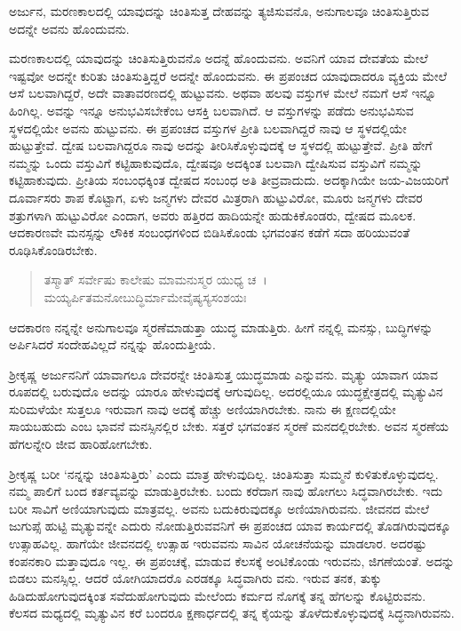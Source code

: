 {\small ಅರ್ಜುನ, ಮರಣಕಾಲದಲ್ಲಿ ಯಾವುದನ್ನು ಚಿಂತಿಸುತ್ತ ದೇಹವನ್ನು ತ್ಯಜಿಸುವನೊ, ಅನುಗಾಲವೂ ಚಿಂತಿಸುತ್ತಿರುವ ಅದನ್ನೇ ಅವನು ಹೊಂದುವನು.}

ಮರಣಕಾಲದಲ್ಲಿ ಯಾವುದನ್ನು ಚಿಂತಿಸುತ್ತಿರುವನೊ ಅದನ್ನೆ ಹೊಂದುವನು. ಅವನಿಗೆ ಯಾವ ದೇವತೆಯ ಮೇಲೆ ಇಷ್ಟವೋ ಅದನ್ನೇ ಕುರಿತು ಚಿಂತಿಸುತ್ತಿದ್ದರೆ ಅದನ್ನೇ ಹೊಂದುವನು. ಈ ಪ್ರಪಂಚದ ಯಾವುದಾದರೂ ವ್ಯಕ್ತಿಯ ಮೇಲೆ ಆಸೆ ಬಲವಾಗಿದ್ದರೆ, ಅದೇ ವಾತಾವರಣದಲ್ಲಿ ಹುಟ್ಟುವನು. ಅಥವಾ ಹಲವು ವಸ್ತುಗಳ ಮೇಲೆ ನಮಗೆ ಆಸೆ ಇನ್ನೂ ಹಿಂಗಿಲ್ಲ. ಅವನ್ನು ಇನ್ನೂ ಅನುಭವಿಸಬೇಕೆಂಬ ಆಸಕ್ತಿ ಬಲವಾಗಿದೆ. ಆ ವಸ್ತುಗಳನ್ನು ಪಡೆದು ಅನುಭವಿಸುವ ಸ್ಥಳದಲ್ಲಿಯೇ ಅವನು ಹುಟ್ಟುವನು. ಈ ಪ್ರಪಂಚದ ವಸ್ತುಗಳ ಪ್ರೀತಿ ಬಲವಾಗಿದ್ದರೆ ನಾವು ಆ ಸ್ಥಳದಲ್ಲಿಯೇ ಹುಟ್ಟುತ್ತೇವೆ. ದ್ವೇಷ ಬಲವಾಗಿದ್ದರೂ ನಾವು ಅದನ್ನು ತೀರಿಸಿಕೊಳ್ಳುವುದಕ್ಕೆ ಆ ಸ್ಥಳದಲ್ಲಿ ಹುಟ್ಟುತ್ತೇವೆ. ಪ್ರೀತಿ ಹೇಗೆ ನಮ್ಮನ್ನು ಒಂದು ವಸ್ತುವಿಗೆ ಕಟ್ಟಿಹಾಕುವುದೊ, ದ್ವೇಷವೂ ಅದಕ್ಕಿಂತ ಬಲವಾಗಿ ದ್ವೇಷಿಸುವ ವಸ್ತುವಿಗೆ ನಮ್ಮನ್ನು ಕಟ್ಟಿಹಾಕುವುದು. ಪ್ರೀತಿಯ ಸಂಬಂಧಕ್ಕಿಂತ ದ್ವೇಷದ ಸಂಬಂಧ ಅತಿ ತೀವ್ರವಾದುದು. ಅದಕ್ಕಾಗಿಯೇ ಜಯ-ವಿಜಯರಿಗೆ ದೂರ್ವಾಸರು ಶಾಪ ಕೊಟ್ಟಾಗ, ಏಳು ಜನ್ಮಗಳು ದೇವರ ಮಿತ್ರರಾಗಿ ಹುಟ್ಟುವಿರೋ, ಮೂರು ಜನ್ಮಗಳು ದೇವರ ಶತ್ರುಗಳಾಗಿ ಹುಟ್ಟುವಿರೋ ಎಂದಾಗ, ಅವರು ಹತ್ತಿರದ ಹಾದಿಯನ್ನೇ ಹುಡುಕಿಕೊಂಡರು, ದ್ವೇಷದ ಮೂಲಕ. ಆದಕಾರಣವೇ ಮನಸ್ಸನ್ನು ಲೌಕಿಕ ಸಂಬಂಧಗಳಿಂದ ಬಿಡಿಸಿಕೊಂಡು ಭಗವಂತನ ಕಡೆಗೆ ಸದಾ ಹರಿಯುವಂತೆ ರೂಢಿಸಿಕೊಂಡಿರಬೇಕು.

\begin{verse}
ತಸ್ಮಾತ್ ಸರ್ವೇಷು ಕಾಲೇಷು ಮಾಮನುಸ್ಮರ ಯುಧ್ಯ ಚ~।\\ಮಯ್ಯರ್ಪಿತಮನೋಬುದ್ಧಿರ್ಮಾಮೇವೈಷ್ಯಸ್ಯಸಂಶಯಃ 
\end{verse}

{\small ಆದಕಾರಣ ನನ್ನನ್ನೇ ಅನುಗಾಲವೂ ಸ್ಮರಣೆಮಾಡುತ್ತಾ ಯುದ್ಧ ಮಾಡುತ್ತಿರು. ಹೀಗೆ ನನ್ನಲ್ಲಿ ಮನಸ್ಸು, ಬುದ್ಧಿಗಳನ್ನು ಅರ್ಪಿಸಿದರೆ ಸಂದೇಹವಿಲ್ಲದೆ ನನ್ನನ್ನು ಹೊಂದುತ್ತೀಯೆ.}

ಶ‍್ರೀಕೃಷ್ಣ ಅರ್ಜುನನಿಗೆ ಯಾವಾಗಲೂ ದೇವರನ್ನೇ ಚಿಂತಿಸುತ್ತ ಯುದ್ಧಮಾಡು ಎನ್ನುವನು. ಮೃತ್ಯು ಯಾವಾಗ ಯಾವ ರೂಪದಲ್ಲಿ ಬರುವುದೊ ಅದನ್ನು ಯಾರೂ ಹೇಳುವುದಕ್ಕೆ ಆಗುವುದಿಲ್ಲ. ಅದರಲ್ಲಿಯೂ ಯುದ್ಧಕ್ಷೇತ್ರದಲ್ಲಿ ಮೃತ್ಯುವಿನ ಸುರಿಮಳೆಯೇ ಸುತ್ತಲೂ ಇರುವಾಗ ನಾವು ಅದಕ್ಕೆ ಹೆಚ್ಚು ಅಣಿಯಾಗಿರಬೇಕು. ನಾನು ಈ ಕ್ಷಣದಲ್ಲಿಯೇ ಸಾಯಬಹುದು ಎಂಬ ಭಾವನೆ ಮನಸ್ಸಿನಲ್ಲಿರ ಬೇಕು. ಸತ್ತರೆ ಭಗವಂತನ ಸ್ಮರಣೆ ಮನದಲ್ಲಿರಬೇಕು. ಅವನ ಸ್ಮರಣೆಯ ಹೆಗಲನ್ನೇರಿ ಜೀವ ಹಾರಿಹೋಗಬೇಕು.

ಶ‍್ರೀಕೃಷ್ಣ ಬರೀ ‘ನನ್ನನ್ನು ಚಿಂತಿಸುತ್ತಿರು’ ಎಂದು ಮಾತ್ರ ಹೇಳುವುದಿಲ್ಲ. ಚಿಂತಿಸುತ್ತಾ ಸುಮ್ಮನೆ ಕುಳಿತುಕೊಳ್ಳುವುದಲ್ಲ. ನಮ್ಮ ಪಾಲಿಗೆ ಬಂದ ಕರ್ತವ್ಯವನ್ನು ಮಾಡುತ್ತಿರಬೇಕು. ಬಂದು ಕರೆದಾಗ ನಾವು ಹೋಗಲು ಸಿದ್ಧವಾಗಿರಬೇಕು. ಇದು ಬರೀ ಸಾವಿಗೆ ಅಣಿಯಾಗುವುದು ಮಾತ್ರವಲ್ಲ. ಅವನು ಬದುಕಿರುವುದಕ್ಕೂ ಅಣಿಯಾಗಿರುವನು. ಜೀವನದ ಮೇಲೆ ಜುಗುಪ್ಸೆ ಹುಟ್ಟಿ ಮೃತ್ಯುವನ್ನೇ ಎದುರು ನೋಡುತ್ತಿರುವವನಿಗೆ ಈ ಪ್ರಪಂಚದ ಯಾವ ಕಾರ್ಯದಲ್ಲಿ ತೊಡಗಿರುವುದಕ್ಕೂ ಉತ್ಸಾಹವಿಲ್ಲ. ಹಾಗೆಯೇ ಜೀವನದಲ್ಲಿ ಉತ್ಸಾಹ ಇರುವವನು ಸಾವಿನ ಯೋಚನೆಯನ್ನು ಮಾಡಲಾರ. ಅದರಷ್ಟು ಕಂಪನಕಾರಿ ಮತ್ತಾವುದೂ ಇಲ್ಲ. ಈ ಪ್ರಪಂಚಕ್ಕೆ, ಮಾಡುವ ಕೆಲಸಕ್ಕೆ ಅಂಟಿಕೊಂಡು ಇರುವನು, ಜಿಗಣೆಯಂತೆ. ಅದನ್ನು ಬಿಡಲು ಮನಸ್ಸಿಲ್ಲ. ಆದರೆ ಯೋಗಿಯಾದರೊ ಎರಡಕ್ಕೂ ಸಿದ್ಧವಾಗಿರು ವನು. ಇರುವ ತನಕ, ತುಕ್ಕು ಹಿಡಿದುಹೋಗುವುದಕ್ಕಿಂತ ಸವೆದುಹೋಗುವುದು ಮೇಲೆಂದು ಕರ್ಮದ ನೊಗಕ್ಕೆ ತನ್ನ ಹೆಗಲನ್ನು ಕೊಟ್ಟಿರುವನು. ಕೆಲಸದ ಮಧ್ಯದಲ್ಲಿ ಮೃತ್ಯುವಿನ ಕರೆ ಬಂದರೂ ಕ್ಷಣಾರ್ಧದಲ್ಲಿ ತನ್ನ ಕೈಯನ್ನು ತೊಳೆದುಕೊಳ್ಳುವುದಕ್ಕೆ ಸಿದ್ಧನಾಗಿರುವನು.


